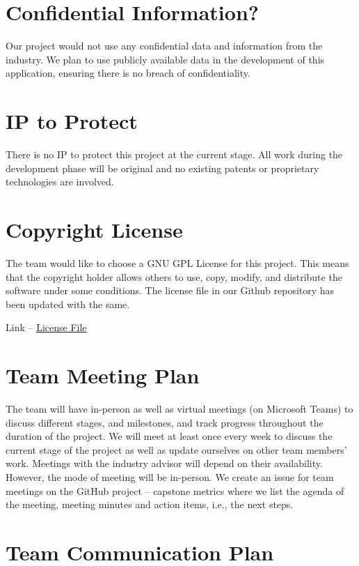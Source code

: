 \documentclass{article}
\begin{document}
\section{Confidential Information?}

Our project would not use any confidential data and information from the industry. We plan to use publicly available data in the development of this application, ensuring there is no breach of confidentiality.

\section{IP to Protect}

There is no IP to protect this project at the current stage. All work during the development phase will be original and no existing patents or proprietary technologies are involved. 

\section{Copyright License}

The team would like to choose a GNU GPL License for this project. This means that the copyright holder allows others to use, copy, modify, and distribute the software under some conditions. The license file in our Github repository has been updated with the same.

Link --  
\href{https://github.com/Inreet-Kaur/capstone/blob/main/LICENSE}{License File}


\section{Team Meeting Plan}

The team will have in-person as well as virtual meetings (on Microsoft Teams) to discuss different stages, and milestones, and track progress throughout the duration of the project. We will meet at least once every week to discuss the current stage of the project as well as update ourselves on other team members’ work. 
Meetings with the industry advisor will depend on their availability. However, the mode of meeting will be in-person. We create an issue for team meetings on the GitHub project – capstone metrics where we list the agenda of the meeting, meeting minutes and action items, i.e., the next steps.

\section{Team Communication Plan}
\end{document}
